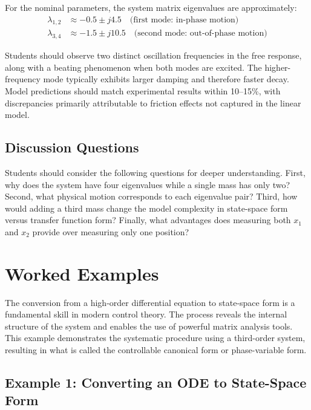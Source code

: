 For the nominal parameters, the system matrix eigenvalues are approximately:
\begin{align}
    \lambda_{1,2} &\approx -0.5 \pm j4.5 \quad \text{(first mode: in-phase motion)} \\
    \lambda_{3,4} &\approx -1.5 \pm j10.5 \quad \text{(second mode: out-of-phase motion)}
\end{align}

Students should observe two distinct oscillation frequencies in the free response, along with a beating phenomenon when both modes are excited. The higher-frequency mode typically exhibits larger damping and therefore faster decay. Model predictions should match experimental results within 10--15\%, with discrepancies primarily attributable to friction effects not captured in the linear model.

\subsection{Discussion Questions}

Students should consider the following questions for deeper understanding. First, why does the system have four eigenvalues while a single mass has only two? Second, what physical motion corresponds to each eigenvalue pair? Third, how would adding a third mass change the model complexity in state-space form versus transfer function form? Finally, what advantages does measuring both $x_1$ and $x_2$ provide over measuring only one position?

\section{Worked Examples}

\begin{examplebox}
The conversion from a high-order differential equation to state-space form is a fundamental skill in modern control theory. The process reveals the internal structure of the system and enables the use of powerful matrix analysis tools. This example demonstrates the systematic procedure using a third-order system, resulting in what is called the controllable canonical form or phase-variable form.
\end{examplebox}

\subsection{Example 1: Converting an ODE to State-Space Form}

